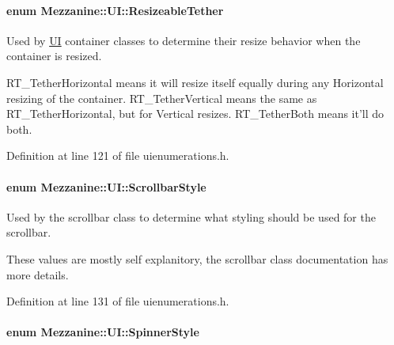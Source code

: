 \hypertarget{namespaceMezzanine_1_1UI_a0334e290e4c9f6a5468fbe11164a17b9}{
\paragraph[{ResizeableTether}]{\setlength{\rightskip}{0pt plus 5cm}enum {\bf Mezzanine::UI::ResizeableTether}}\hfill}
\label{namespaceMezzanine_1_1UI_a0334e290e4c9f6a5468fbe11164a17b9}


Used by \hyperlink{namespaceMezzanine_1_1UI}{UI} container classes to determine their resize behavior when the container is resized. 

RT\_\-TetherHorizontal means it will resize itself equally during any Horizontal resizing of the container. RT\_\-TetherVertical means the same as RT\_\-TetherHorizontal, but for Vertical resizes. RT\_\-TetherBoth means it'll do both. 

Definition at line 121 of file uienumerations.h.

\hypertarget{namespaceMezzanine_1_1UI_a5998a9bf372a7e92605c0c461736e763}{
\paragraph[{ScrollbarStyle}]{\setlength{\rightskip}{0pt plus 5cm}enum {\bf Mezzanine::UI::ScrollbarStyle}}\hfill}
\label{namespaceMezzanine_1_1UI_a5998a9bf372a7e92605c0c461736e763}


Used by the scrollbar class to determine what styling should be used for the scrollbar. 

These values are mostly self explanitory, the scrollbar class documentation has more details. 

Definition at line 131 of file uienumerations.h.

\hypertarget{namespaceMezzanine_1_1UI_a62462d4df783dcdda77e1590a96bc6d6}{
\paragraph[{SpinnerStyle}]{\setlength{\rightskip}{0pt plus 5cm}enum {\bf Mezzanine::UI::SpinnerStyle}}\hfill}
\label{namespaceMezzanine_1_1UI_a62462d4df783dcdda77e1590a96bc6d6}



